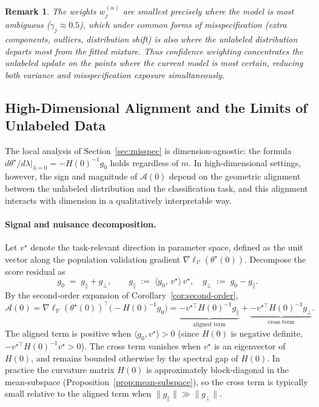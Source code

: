 \documentclass[11pt]{article}
\newtheorem{remark}{Remark}
\theoremstyle{definition}
\newcommand{\lam}{\lambda}
\newcommand{\calV}{\mathcal{V}}
\newcommand{\calA}{\mathcal{A}}
\begin{document}
\begin{remark}
The weights \(w_j^{(\alpha)}\) are smallest precisely where the model is
most ambiguous (\(\gamma_j\approx 0.5\)), which under common forms of
misspecification (extra components, outliers, distribution shift) is also
where the unlabeled distribution departs most from the fitted mixture.
Thus confidence weighting concentrates the unlabeled update on the
points where the current model is most certain, reducing both variance
and misspecification exposure simultaneously.
\end{remark}


\subsection{High-Dimensional Alignment and the Limits of Unlabeled Data}
\label{sec:high-dim-theory}

The local analysis of Section~\ref{sec:misspec} is dimension-agnostic:
the formula \(d\theta^\star/d\lam\big|_{\lam=0} = -H(0)^{-1}g_0\)
holds regardless of \(m\).
In high-dimensional settings, however, the sign and magnitude of
\(\calA(0)\) depend on the geometric alignment between the unlabeled
distribution and the classification task, and this alignment interacts
with dimension in a qualitatively interpretable way.

\paragraph{Signal and nuisance decomposition.}
Let \(v^\star\) denote the task-relevant direction in parameter space,
defined as the unit vector along the population validation gradient
\(\nabla\ell_\calV(\theta^\star(0))\).
Decompose the score residual as
\[
g_0 \;=\; g_\parallel + g_\perp, \qquad
g_\parallel \;:=\; \langle g_0,\, v^\star\rangle\, v^\star,\quad
g_\perp \;:=\; g_0 - g_\parallel.
\]
By the second-order expansion of Corollary~\ref{cor:second-order},
\[
\calA(0)
= \nabla\ell_\calV(\theta^\star(0))^\top\bigl(-H(0)^{-1}g_0\bigr)
= \underbrace{-v^{\star\top}H(0)^{-1}g_\parallel}_{\text{aligned term}}
+ \underbrace{-v^{\star\top}H(0)^{-1}g_\perp}_{\text{cross term}}.
\]
The aligned term is positive when \(\langle g_0, v^\star\rangle > 0\)
(since \(H(0)\) is negative definite, \(-v^{\star\top}H(0)^{-1}v^\star > 0\)).
The cross term vanishes when \(v^\star\) is an eigenvector of \(H(0)\),
and remains bounded otherwise by the spectral gap of \(H(0)\).
In practice the curvature matrix \(H(0)\) is approximately block-diagonal
in the mean-subspace (Proposition~\ref{prop:mean-subspace}), so the
cross term is typically small relative to the aligned term when
\(\|g_\parallel\| \gg \|g_\perp\|\).
\end{document}
